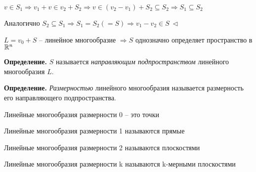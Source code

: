 $v \in S_1 \Rightarrow v_1 + v \in v_2 + S_2 \Rightarrow v \in (v_2 - v_1) + S_2 \subseteq S_2 \Rightarrow S_1 \subseteq S_2$

Аналогично $S_2 \subseteq S_1 \Rightarrow S_1 = S_2 (=S) \Rightarrow v_1 - v_2 \in S \ \lhd$

\bigskip
$L = v_0 + S$ -- линейное многообразие $\Rightarrow S$ однозначно определяет пространство в $\mathbb{R}^n$

\bigskip
\textbf{Определение.} $S$ называется \textit{направляющим подпространством} линейного многообразия $L$.

\bigskip
\textbf{Определение.} \textit{Размерностью} линейного многообразия называется размерность его направляющего подпространства.

Линейные многообразия размерности 0 -- это точки

Линейные многообразия размерности 1 называются прямые

Линейные многообразия размерности 2 называются плоскостями

Линейные многообразия размерности k называются k-мерными плоскостями

